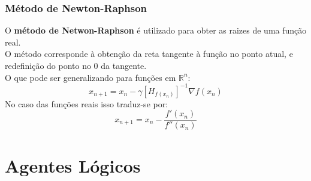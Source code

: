 \documentclass[]{report}
\begin{document}
\subsection{Método de Newton-Raphson}
O \textbf{método de Netwon-Raphson} é utilizado para obter as raizes de uma função real.\\
O método corresponde à obtenção da reta tangente à função no ponto atual, e redefinição do ponto no 0 da tangente.\\
O que pode ser generalizando para funções em $\mathbb{R}^n$:
$$x_{n+1} = x_n - \gamma [H_{f(x_n)}]^{-1}\nabla f(x_n)$$
No caso das funções reais isso traduz-se por:
$$x_{n+1} = x_n - \frac{f'(x_n)}{f''(x_n)}$$
\chapter{Agentes Lógicos}
\end{document}
